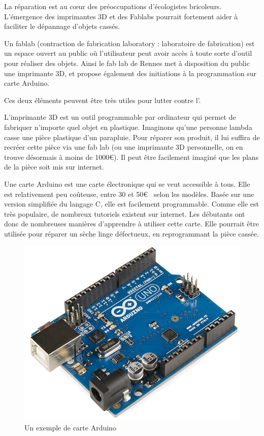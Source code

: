 La réparation est au cœur des préoccupations d'écologistes bricoleurs. L'émergence des imprimantes 3D et des Fablabs pourrait fortement aider  à faciliter le dépannage d'objets cassés. 

Un fablab (contraction de fabrication laboratory : laboratoire de fabrication) est un espace ouvert au public où l'utilisateur peut avoir accès à  toute sorte d'outil pour réaliser des objets. Ainsi le fab lab de Rennes met à disposition du public une imprimante 3D, et propose également des initiations à la programmation sur carte Arduino.

Ces deux éléments peuvent être très utiles pour lutter contre l'\op. 

L'imprimante 3D est un outil programmable par ordinateur qui permet de fabriquer n'importe quel objet en plastique. Imaginons qu'une personne lambda casse une pièce plastique d'un parapluie. Pour réparer son produit, il lui suffira de recréer cette pièce via une fab lab (ou une imprimante 3D personnelle, on en trouve désormais à moins de 1000\euro). Il peut être facilement imaginé que les plans de la pièce soit mis sur internet. 

\bigbreak
Une carte Arduino est une carte électronique qui se veut accessible à tous. Elle est relativement peu coûteuse, entre 30 et 50\euro~ selon les modèles. Basée sur une version simplifiée du langage C, elle est facilement programmable. Comme elle est très populaire, de nombreux tutoriels existent sur internet. Les débutants ont donc de nombreuses manières d'apprendre à utiliser cette carte. Elle pourrait être utilisée pour réparer un sèche linge défectueux, en reprogrammant la pièce cassée.

\begin{figure}
\begin{center}
\vspace{-1cm}\includegraphics[scale=0.25]{Rsc/Arduino.png} 

\caption{Un exemple de carte Arduino}
\end{center}
\end{figure}

